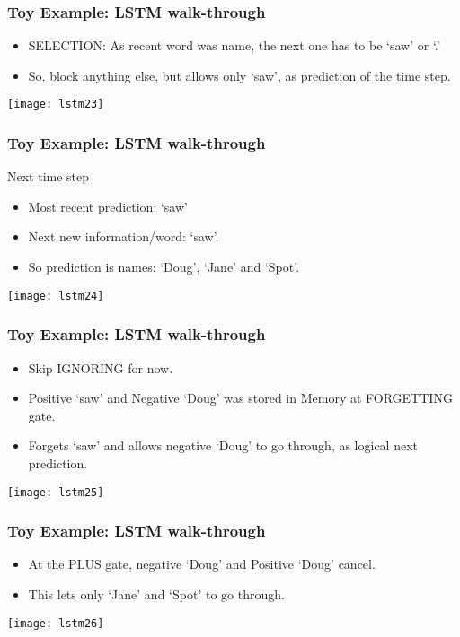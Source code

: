 \begin{frame}[fragile] \frametitle{Toy Example: LSTM walk-through}
\begin{itemize}
\item SELECTION: As recent word was name, the next one has to be `saw' or `.'
\item So, block anything else, but allows only `saw', as prediction of the time step.
\end{itemize}
\begin{center}
\texttt{[image: lstm23]}
\end{center}
\end{frame}

\begin{frame}[fragile] \frametitle{Toy Example: LSTM walk-through}
Next time step
\begin{itemize}
\item Most recent prediction: `saw'
\item Next new information/word: `saw'.
\item So prediction is names: `Doug', `Jane' and `Spot'.
\end{itemize}
\begin{center}
\texttt{[image: lstm24]}
\end{center}
\end{frame}

\begin{frame}[fragile] \frametitle{Toy Example: LSTM walk-through}
\begin{itemize}
\item Skip IGNORING for now.
\item Positive `saw' and Negative `Doug' was stored in Memory at FORGETTING gate.
\item Forgets `saw' and allows negative `Doug' to go through, as logical next prediction.
\end{itemize}
\begin{center}
\texttt{[image: lstm25]}
\end{center}
\end{frame}

\begin{frame}[fragile] \frametitle{Toy Example: LSTM walk-through}
\begin{itemize}
\item At the PLUS gate, negative `Doug' and Positive `Doug' cancel.
\item This lets only `Jane' and `Spot' to go through.
\end{itemize}
\begin{center}
\texttt{[image: lstm26]}
\end{center}
\end{frame}


